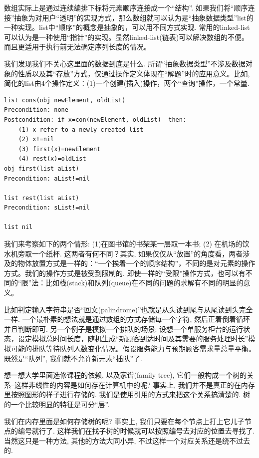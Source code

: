 数组实际上是通过连续编排下标将元素顺序连接成一个“结构”. 如果我们将“顺序连接”抽象为对用户“透明”的实现方式，那么数组就可以认为是“抽象数据类型”list的一种实现。list中“顺序”的概念是抽象的，可以用不同方式实现. 常用的linked-list可以认为是一种使用“指针”的实现。显然linked-list(链表)可以解决数组的不便。而且更适用于执行前无法确定序列长度的情况。

我们发现我们不关心这里面的数据到底是什么. 所谓“抽象数据类型”不涉及数据对象的性质以及其“存放”方式，仅通过操作定义体现在“解题”时的应用意义。比如, 简化的list由4个操作定义：(1)一个创建(插入)操作，两个“查询”操作，一个常量.

\begin{lstlisting}
list cons(obj newElement, oldList)
Precondition: none
Postcondition: if x=con(newElement, oldList)  then:
    (1) x refer to a newly created list
    (2) x!=nil
    (3) first(x)=newElement
    (4) rest(x)=oldList
obj first(list aList)
Precondition: aList!=nil

list rest(list aList)
Precondition: sList!=nil

list nil
\end{lstlisting}



我们来考察如下的两个情形: (1)在图书馆的书架某一层取一本书; (2) 在机场的饮水机旁取一个纸杯. 这两者有何不同？其实, 如果仅仅从“放置”的角度看，两者涉及的物体放置方式是一样的：“一个挨着一个的顺序结构”，不同的是对元素的操作方式。我们的操作方式是被受到限制的. 即使一样的“受限”操作方式，也可以有不同的“限”法：比如栈(stack)和队列(queue)在不同的问题的求解有不同的明显的意义。


比如判定输入字符串是否“回文(palindrome)”也就是从头读到尾与从尾读到头完全一样. 一个最朴素的想法就是通过数组的方式存储每一个字符, 然后正着倒着循环并且判断即可. 另一个例子是模拟一个排队的场景: 设想一个单服务柜台的运行状态，设定模拟总时间长度，随机生成“新顾客到达时间及其需要的服务处理时长”模拟可能的排队等待队列人数变化情况。假设服务能力与预期顾客需求量总量平衡。既然是``队列'', 我们就不允许新元素``插队''了. 

想一想大学里面选修课程的依赖, 以及家谱(family tree), 它们一般构成一个树的关系--这样非线性的内容是如何存在计算机中的呢? 事实上, 我们并不是真正的在内存里按照图形的样子进行存储的. 我们是使用引用的方式来把这个关系搞清楚的. 树的一个比较明显的特征是可分“层”. 

我们在内存里面是如何存储树的呢? 事实上, 我们只要在每个节点上打上它儿子节点的编号就行了. 这样我们在找子树的时候就可以按照编号去对应的位置去寻找了. 当然这只是一种方法, 其他的方法大同小异, 不过这样一个对应关系还是绕不过去的. 

